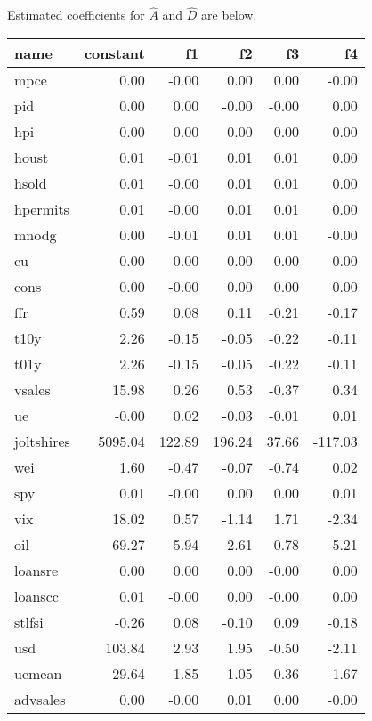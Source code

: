 \documentclass[11pt, letterpaper]{article}\usepackage[]{graphicx}\usepackage[]{color}
\begin{document}
Estimated coefficients for $\widehat{A}$ and $\widehat{D}$ are below.
\begin{table}[H]
\centering
\begingroup\footnotesize
\begin{tabular}{lrrrrr}
  \hline
name & constant & f1 & f2 & f3 & f4 \\ 
  \hline
mpce & 0.00 & -0.00 & 0.00 & 0.00 & -0.00 \\ 
  pid & 0.00 & 0.00 & -0.00 & -0.00 & 0.00 \\ 
  hpi & 0.00 & 0.00 & 0.00 & 0.00 & 0.00 \\ 
  houst & 0.01 & -0.01 & 0.01 & 0.01 & 0.00 \\ 
  hsold & 0.01 & -0.00 & 0.01 & 0.01 & 0.00 \\ 
  hpermits & 0.01 & -0.00 & 0.01 & 0.01 & 0.00 \\ 
  mnodg & 0.00 & -0.01 & 0.01 & 0.01 & -0.00 \\ 
  cu & 0.00 & -0.00 & 0.00 & 0.00 & -0.00 \\ 
  cons & 0.00 & -0.00 & 0.00 & 0.00 & 0.00 \\ 
  ffr & 0.59 & 0.08 & 0.11 & -0.21 & -0.17 \\ 
  t10y & 2.26 & -0.15 & -0.05 & -0.22 & -0.11 \\ 
  t01y & 2.26 & -0.15 & -0.05 & -0.22 & -0.11 \\ 
  vsales & 15.98 & 0.26 & 0.53 & -0.37 & 0.34 \\ 
  ue & -0.00 & 0.02 & -0.03 & -0.01 & 0.01 \\ 
  joltshires & 5095.04 & 122.89 & 196.24 & 37.66 & -117.03 \\ 
  wei & 1.60 & -0.47 & -0.07 & -0.74 & 0.02 \\ 
  spy & 0.01 & -0.00 & 0.00 & 0.00 & 0.01 \\ 
  vix & 18.02 & 0.57 & -1.14 & 1.71 & -2.34 \\ 
  oil & 69.27 & -5.94 & -2.61 & -0.78 & 5.21 \\ 
  loansre & 0.00 & 0.00 & 0.00 & -0.00 & 0.00 \\ 
  loanscc & 0.01 & -0.00 & 0.00 & -0.00 & 0.00 \\ 
  stlfsi & -0.26 & 0.08 & -0.10 & 0.09 & -0.18 \\ 
  usd & 103.84 & 2.93 & 1.95 & -0.50 & -2.11 \\ 
  uemean & 29.64 & -1.85 & -1.05 & 0.36 & 1.67 \\ 
  advsales & 0.00 & -0.00 & 0.01 & 0.00 & -0.00 \\ 

\end{tabular}
\end{table}
\end{document}
